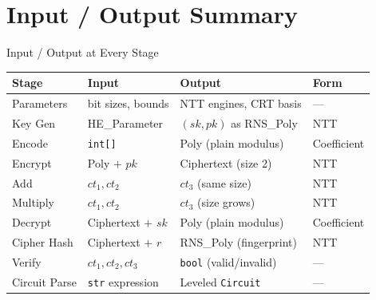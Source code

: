 \documentclass[aspectratio=169, 11pt]{beamer}
\begin{document}
\section{Input / Output Summary}

\begin{frame}{Input / Output at Every Stage}
\begin{center}
\small
\begin{tabular}{@{}llll@{}}
\toprule
\textbf{Stage} & \textbf{Input} & \textbf{Output} & \textbf{Form} \\
\midrule
Parameters & bit sizes, bounds & NTT engines, CRT basis & --- \\
Key Gen & HE\_Parameter & $(sk, pk)$ as RNS\_Poly & NTT \\
Encode & \texttt{int[]} & Poly (plain modulus) & Coefficient \\
Encrypt & Poly $+$ $pk$ & Ciphertext (size 2) & NTT \\
Add & $ct_1, ct_2$ & $ct_3$ (same size) & NTT \\
Multiply & $ct_1, ct_2$ & $ct_3$ (size grows) & NTT \\
Decrypt & Ciphertext $+$ $sk$ & Poly (plain modulus) & Coefficient \\
\midrule
Cipher Hash & Ciphertext $+$ $r$ & RNS\_Poly (fingerprint) & NTT \\
Verify & $ct_1, ct_2, ct_3$ & \texttt{bool} (valid/invalid) & --- \\
Circuit Parse & \texttt{str} expression & Leveled \texttt{Circuit} & --- \\
\bottomrule
\end{tabular}
\end{center}
\end{frame}
\end{document}
